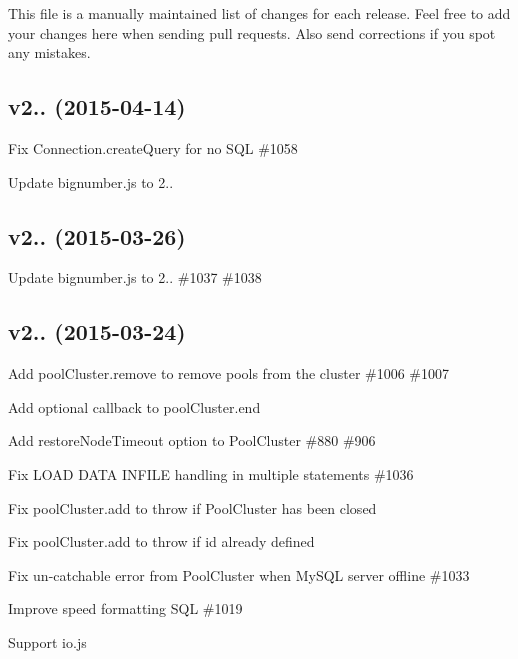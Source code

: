 This file is a manually maintained list of changes for each release. Feel free to add your changes here when sending pull requests. Also send corrections if you spot any mistakes.

\subsection*{v2.. (2015-\/04-\/14)}


\begin{DoxyItemize}
\item Fix {\ttfamily Connection.\+create\+Query} for no S\+Q\+L \#1058
\item Update {\ttfamily bignumber.\+js} to 2..
\end{DoxyItemize}

\subsection*{v2.. (2015-\/03-\/26)}


\begin{DoxyItemize}
\item Update {\ttfamily bignumber.\+js} to 2.. \#1037 \#1038
\end{DoxyItemize}

\subsection*{v2.. (2015-\/03-\/24)}


\begin{DoxyItemize}
\item Add {\ttfamily pool\+Cluster.\+remove} to remove pools from the cluster \#1006 \#1007
\item Add optional callback to {\ttfamily pool\+Cluster.\+end}
\item Add {\ttfamily restore\+Node\+Timeout} option to {\ttfamily Pool\+Cluster} \#880 \#906
\item Fix L\+O\+A\+D D\+A\+T\+A I\+N\+F\+I\+L\+E handling in multiple statements \#1036
\item Fix {\ttfamily pool\+Cluster.\+add} to throw if {\ttfamily Pool\+Cluster} has been closed
\item Fix {\ttfamily pool\+Cluster.\+add} to throw if {\ttfamily id} already defined
\item Fix un-\/catchable error from {\ttfamily Pool\+Cluster} when My\+S\+Q\+L server offline \#1033
\item Improve speed formatting S\+Q\+L \#1019
\item Support io.\+js
\end{DoxyItemize}

